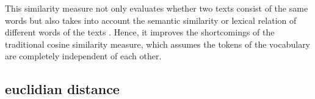 This similarity measure not only evaluates whether two texts consist of the same words but 
also takes into account the semantic similarity or lexical relation of different words of the texts \cite{soft_cosine2017}.
Hence, it improves the shortcomings of the traditional cosine similarity measure, 
which assumes the tokens of the vocabulary are completely independent of each other.



\subsection{euclidian distance}\label{subsec:euclidian-distance}

